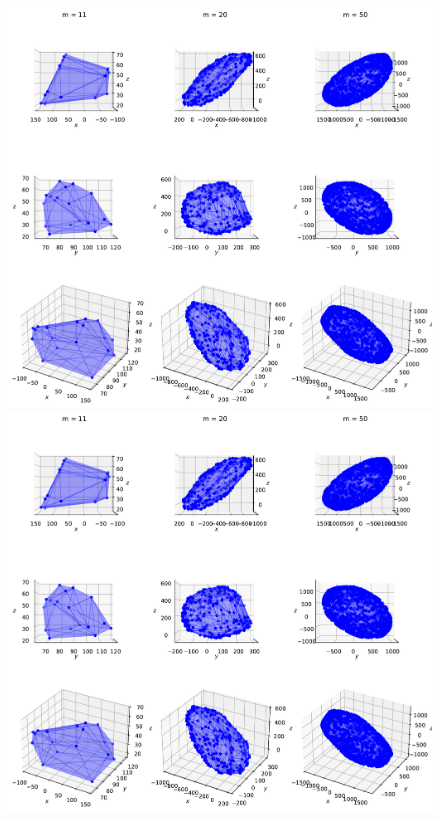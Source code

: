 \begin{figure}[!htb]
    \captionsetup{justification=centering}
    \begin{minipage}{1\linewidth}
        \centering
        \includegraphics[trim={0 700 0 0},clip, width=0.9\linewidth]{img/chapter_3/zonotopes_looks_like_ellipsoids.pdf}
    \end{minipage}
    \begin{minipage}{1\linewidth}
        \centering
        \includegraphics[trim={0 500 0 60},clip, width=0.9\linewidth]{img/chapter_3/zonotopes_looks_like_ellipsoids.pdf}

\end{minipage}
\end{figure}
